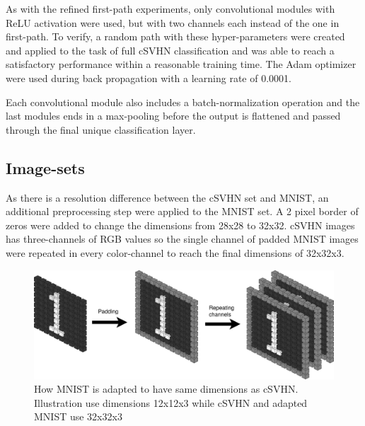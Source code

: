 As with the refined first-path experiments, only convolutional modules with ReLU activation were used, but with two channels each instead of the one in first-path. To verify, a random path with these hyper-parameters were created and applied to the task of full cSVHN classification and was able to reach a satisfactory performance within a reasonable training time. The Adam optimizer were used during back propagation with a learning rate of 0.0001. 

Each convolutional module also includes a batch-normalization operation and the last modules ends in a max-pooling before the output is flattened and passed through the final unique classification layer. 

\subsection{Image-sets}
As there is a resolution difference between the cSVHN set and MNIST, an additional preprocessing step were applied to the MNIST set. A 2 pixel border of zeros were added to change the dimensions from 28x28 to 32x32. cSVHN images has three-channels of RGB values so the single channel of padded MNIST images were repeated in every color-channel to reach the final dimensions of 32x32x3.  

\begin{figure}[h]
    \includegraphics[width=\textwidth]{Chapters/Experiments/search_algo/figures/MNISTpadding+repeating.png}
    \caption{How MNIST is adapted to have same dimensions as cSVHN. Illustration use dimensions 12x12x3 while cSVHN and adapted MNIST use 32x32x3}
    \label{fig:MNISTpadding}
\end{figure}

